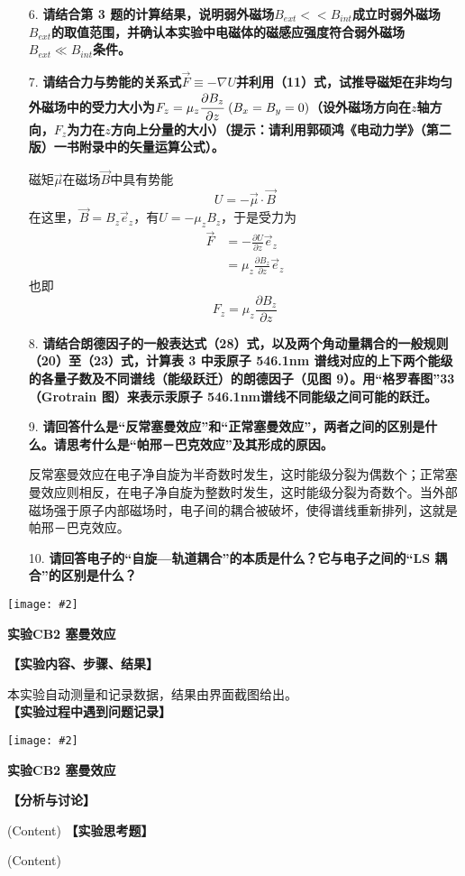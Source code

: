 \documentclass[11pt,a4paper]{ctexart}
\newcommand{\ExpeName}{实验CB2 塞曼效应}
\newcommand{\cpic}[2]{
\begin{center}
\texttt{[image: \#2]}
\end{center}
}
\newcommand{\beq}{\begin{equation}}
\newcommand{\eeq}{\end{equation}}
\newcommand{\bea}{\begin{equation}\begin{aligned}}
\newcommand{\eea}{\end{aligned}\end{equation}}
\begin{document}
\begin{enumerate}
\item[6.] \textbf{请结合第 3 题的计算结果，说明弱外磁场$B_{ext}<<B_{int}$成立时弱外磁场$B_{ext}$的取值范围，并确认本实验中电磁体的磁感应强度符合弱外磁场$B_{ext} \ll B_{int}$条件。}
\item[7.] \textbf{请结合力与势能的关系式$\vec{F} \equiv - \nabla U$并利用（11）式，试推导磁矩在非均匀外磁场中的受力大小为$F_z = \mu_z \cfrac{\partial B_z}{\partial z} \ (B_x = B_y = 0)$（设外磁场方向在$z$轴方向，$F_z$为力在$z$方向上分量的大小）（提示：请利用郭硕鸿《电动力学》（第二版）一书附录中的矢量运算公式）。}\par
磁矩$\vec{\mu}$在磁场$\vec{B}$中具有势能
\beq
U = -\vec{\mu} \cdot \vec{B}
\eeq
在这里，$\vec{B} = B_z \vec{e}_z$，有$U = - \mu_z B_z$，于是受力为
\bea
\vec{F} &= - \frac{\partial U}{\partial z} \vec{e}_z \\
&=\mu_z \frac{\partial B_z}{\partial z} \vec{e}_z
\eea
也即
\beq
F_z = \mu_z \frac{\partial B_z}{\partial z}
\eeq

\item[8.] \textbf{请结合朗德因子的一般表达式（28）式，以及两个角动量耦合的一般规则（20）至（23）式，计算表 3 中汞原子 546.1nm 谱线对应的上下两个能级的各量子数及不同谱线（能级跃迁）的朗德因子（见图 9）。用“格罗春图”33（Grotrain 图）来表示汞原子 546.1nm谱线不同能级之间可能的跃迁。}

\item[9.] \textbf{请回答什么是“反常塞曼效应”和“正常塞曼效应”，两者之间的区别是什么。请思考什么是“帕邢－巴克效应”及其形成的原因。}\par
反常塞曼效应在电子净自旋为半奇数时发生，这时能级分裂为偶数个；正常塞曼效应则相反，在电子净自旋为整数时发生，这时能级分裂为奇数个。当外部磁场强于原子内部磁场时，电子间的耦合被破坏，使得谱线重新排列，这就是帕邢－巴克效应。

\item[10.] \textbf{请回答电子的“自旋—轨道耦合”的本质是什么？它与电子之间的“LS 耦合”的区别是什么？}
\end{enumerate}

\newpage%
\cpic{0.255}{e2}%
\begin{center}
\LARGE{\textbf{\ExpeName}}
\end{center}
\textbf{【实验内容、步骤、结果】}
\par
本实验自动测量和记录数据，结果由界面截图给出。
\newline
\textbf{【实验过程中遇到问题记录】}

%

\newpage%
\cpic{0.255}{e3}%
\begin{center}
\LARGE\textbf{{\ExpeName}}
\end{center}
\textbf{【分析与讨论】}\par
(Content)
\newline
\textbf{【实验思考题】}\par
(Content)
\end{document}
